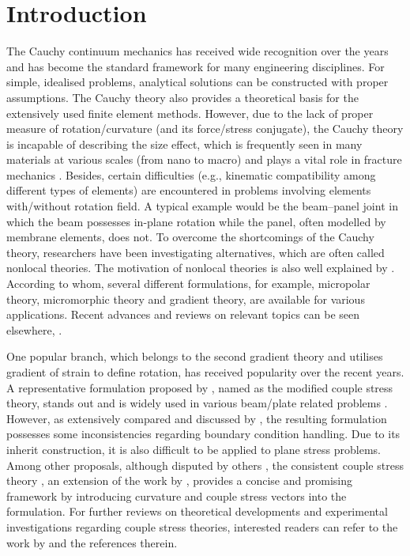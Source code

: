 \documentclass[3p,sort&compress,11pt,fleqn,review]{elsarticle}
\begin{document}
\section{Introduction}
The Cauchy continuum mechanics has received wide recognition over the years and has become the standard framework for many engineering disciplines. For simple, idealised problems, analytical solutions can be constructed \citep[see, e.g.,][]{Timoshenko2010} with proper assumptions. The Cauchy theory also provides a theoretical basis for the extensively used finite element methods. However, due to the lack of proper measure of rotation/curvature (and its force/stress conjugate), the Cauchy theory is incapable of describing the size effect, which is frequently seen in many materials at various scales (from nano to macro) and plays a vital role in fracture mechanics \citep{Bazant1984}. Besides, certain difficulties (e.g., kinematic compatibility among different types of elements) are encountered in problems involving elements with/without rotation field. \alert{A typical example would be the beam--panel joint in which the beam possesses in-plane rotation while the panel, often modelled by membrane elements, does not.} To overcome the shortcomings of the Cauchy theory, researchers have been investigating alternatives, which are often called nonlocal theories. \alert{The motivation of nonlocal theories is also well explained by \citet{Eringen2004}. According to whom, several different formulations, for example, micropolar theory, micromorphic theory and gradient theory, are available for various applications.} Recent advances and reviews on relevant topics can be seen elsewhere, \citep[to name a few,][]{Maugin2010,Altenbach2011,Srinivasa2017,Thai2017,Faghidian2018,Shaat2017,Aifantis2011,Salehipour2015,Apuzzo2018,Lim2015,Shaat2020}.

\alert{One popular branch, which belongs to the second gradient theory and utilises gradient of strain to define rotation, has received popularity over the recent years. A representative formulation proposed by \citet{Yang2002}, named as the modified couple stress theory, stands out and is widely used in various beam/plate related problems \citep[see, e.g.,][]{Khakalo2018,Farokhi2018,Kim2019,Thanh2019,Thanh2019a,Fan2020,Yuan2020,Lu2017}. However, as extensively compared and discussed by \citet{Hadjesfandiari2016}, the resulting formulation possesses some inconsistencies regarding boundary condition handling. Due to its inherit construction, it is also difficult to be applied to plane stress problems. Among other proposals, although disputed by others \citep{Neff2016}, the consistent couple stress theory \citep{Hadjesfandiari2011}, an extension of the work by \citet{Mindlin1968}, provides a concise and promising framework by introducing curvature and couple stress vectors into the formulation.} For further reviews on theoretical developments and experimental investigations regarding couple stress theories, interested readers can refer to the work by \citet{Pedgaonkar2021} and the references therein.
\end{document}
